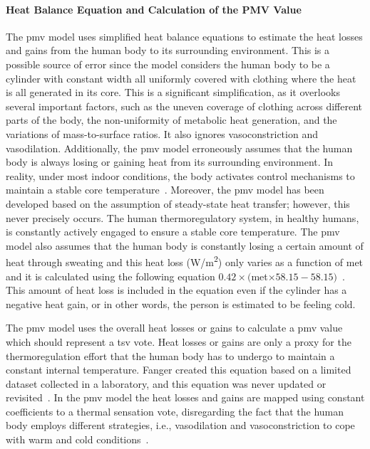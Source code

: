 \paragraph{Heat Balance Equation and Calculation of the PMV Value}
The \ac{pmv} model uses simplified heat balance equations to estimate the heat losses and gains from the human body to its surrounding environment.
This is a possible source of error since the model considers the human body to be a cylinder with constant width all uniformly covered with clothing where the heat is all generated in its core.
This is a significant simplification, as it overlooks several important factors, such as the uneven coverage of clothing across different parts of the body, the non-uniformity of metabolic heat generation, and the variations of mass-to-surface ratios. 
It also ignores vasoconstriction and vasodilation.
Additionally, the \ac{pmv} model erroneously assumes that the human body is always losing or gaining heat from its surrounding environment.
In reality, under most indoor conditions, the body activates control mechanisms to maintain a stable core temperature~\cite{romanovsky_thermoregulation_2018}.
Moreover, the \ac{pmv} model has been developed based on the assumption of steady-state heat transfer; however, this never precisely occurs.
The human thermoregulatory system, in healthy humans, is constantly actively engaged to ensure a stable core temperature.
The \ac{pmv} model also assumes that the human body is constantly losing a certain amount of heat through sweating and this heat loss (W/m\textsuperscript{2}) only varies as a function of \ac{met} and it is calculated using the following equation $0.42\times($\ac{met}$\times58.15 - 58.15)$~\cite{Fanger1970}.
This amount of heat loss is included in the equation even if the cylinder has a negative heat gain, or in other words, the person is estimated to be feeling cold.

The \ac{pmv} model uses the overall heat losses or gains to calculate a \ac{pmv} value which should represent a \ac{tsv} vote.
Heat losses or gains are only a proxy for the thermoregulation effort that the human body has to undergo to maintain a constant internal temperature.
Fanger created this equation based on a limited dataset collected in a laboratory, and this equation was never updated or revisited~\cite{Fanger1970}.
In the \ac{pmv} model the heat losses and gains are mapped using constant coefficients to a thermal sensation vote, disregarding the fact that the human body employs different strategies, i.e., vasodilation and vasoconstriction to cope with warm and cold conditions~\cite{romanovsky_thermoregulation_2018}.

